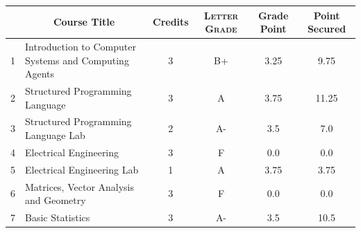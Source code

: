 \documentclass[11pt]{article}
\newcommand*{\numtwo}[1]{\pgfmathprintnumber[
                    fixed, precision=2, fixed zerofill=true]{#1}}
\begin{document}
                \begin{center}
                    \renewcommand{\arraystretch}{1.08}
                    
                \begin{tabular}{|c|l|c|>{\scshape}c|c|c|}
                \hline  \rule[-1ex]{0pt}{3.5ex} {\centering{\bf Course Code}} &  \multicolumn{1}{c|}{\textbf{Course Title}}  & {\bf Credits} & {\bf Letter Grade} & {\bf Grade Point} & {\bf Point Secured}  \\ 
                \hline   1 &  Introduction to Computer Systems and Computing Agents		 & 3 & B+ & 3.25 & 9.75 \\ %
                \hline   2 &  Structured Programming Language		 & 3 & A & 3.75 & 11.25 \\ %
                \hline   3 &  Structured Programming Language Lab		 & 2 & A- & 3.5 & 7.0 \\ %
                \hline   4 &  Electrical Engineering		 & 3 & F & 0.0 & 0.0 \\ %
                \hline   5 &  Electrical Engineering Lab		 & 1 & A & 3.75 & 3.75 \\ %
                \hline   6 &  Matrices, Vector Analysis and Geometry		 & 3 & F & 0.0 & 0.0 \\ %
                \hline   7 &  Basic Statistics		 & 3 & A- & 3.5 & 10.5 \\ %

\hline                %
                \end{tabular}
                \end{center}
                \renewcommand{\arraystretch}{1.03}
\end{document}
